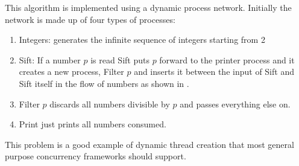 \documentclass[12pt,twoside,notitlepage]{report}
\begin{document}
This algorithm is implemented using a dynamic process network. Initially the network is made up of four types of processes:
\begin{enumerate}
\item{Integers: generates the infinite sequence of integers starting from 2}
\item{Sift: If a number $ p $ is read Sift puts $ p $ forward to the printer process and it creates a new process, Filter $ p $ and inserts it between the input of Sift and Sift itself in the flow of numbers as shown in . }
\item{Filter $ p $ discards all numbers divisible by $ p $ and passes everything else on.}
\item{Print just prints all numbers consumed.}
\end{enumerate}

This problem is a good example of dynamic thread creation that most general purpose concurrency frameworks should support.
\end{document}
